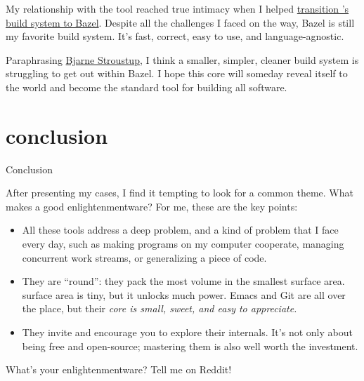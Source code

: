 \documentclass{article}
\begin{document}
My relationship with the tool reached true intimacy when I helped \href{/posts/17-scaling-rust-builds-with-bazel.html}{transition 's build system to Bazel}.
Despite all the challenges I faced on the way, Bazel is still my favorite build system.
It's fast, correct, easy to use, and language-agnostic.

Paraphrasing \href{https://www.stroustrup.com/quotes.html}{Bjarne Stroustup}, I think a smaller, simpler, cleaner build system is struggling to get out within Bazel.
I hope this core will someday reveal itself to the world and become the standard tool for building all software.

\section{conclusion}{Conclusion}

After presenting my cases, I find it tempting to look for a common theme.
What makes a good enlightenmentware?
For me, these are the key points:

\begin{itemize}
  \item
  All these tools address a deep problem, and a kind of problem that I face every day, such as making programs on my computer cooperate, managing concurrent work streams, or generalizing a piece of code.
  \item
  They are ``round'': they pack the most volume in the smallest surface area.
   surface area is tiny, but it unlocks much power.
  Emacs and Git are all over the place, but their \em{core} is small, sweet, and easy to appreciate.
  \item
  They invite and encourage you to explore their internals.
  It's not only about being free and open-source; mastering them is also well worth the investment.
\end{itemize}

What's your enlightenmentware? Tell me on Reddit!
\end{document}
